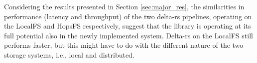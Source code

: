 Considering the results presented in Section \ref{sec:major_res}, the similarities in performance (latency and throughput) of the two delta-rs pipelines, operating on the \gls{LocalFS} and \gls{HopsFS} respectively, suggest that the library is operating at its full potential also in the newly implemented system. Delta-rs on the \gls{LocalFS} still performs faster, but this might have to do with the different nature of the two storage systems, i.e., local and distributed.